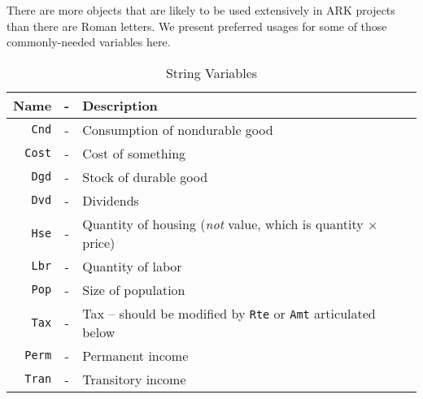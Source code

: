 
There are more objects that are likely to be used extensively in ARK projects than there are Roman letters.  We present preferred usages for some of those commonly-needed variables here.

\begin{table}[h]
\begin{center}
\begin{tabular}{||rcl||}
\hline
Name & - & Description
 \\ \hline \texttt{Cnd}    & - & Consumption of nondurable good
 \\  \texttt{Cost}    & - & Cost of something
 \\  \texttt{Dgd}    & - & Stock of durable good
 \\  \texttt{Dvd}    & - & Dividends
 \\  \texttt{Hse}    & - & Quantity of housing ({\it not} value, which is quantity $\times$ price)
 \\  \texttt{Lbr}    & - & Quantity of labor
 \\  \texttt{Pop}    & - & Size of population
 \\  \texttt{Tax} & - & Tax -- should be modified by \texttt{Rte} or \texttt{Amt} articulated below
 \\  \texttt{Perm}   & - & Permanent income
 \\  \texttt{Tran}   & - & Transitory income
\\ \hline
\end{tabular}
\caption{String Variables}
\label{table:Strings}
\end{center}
\end{table}

